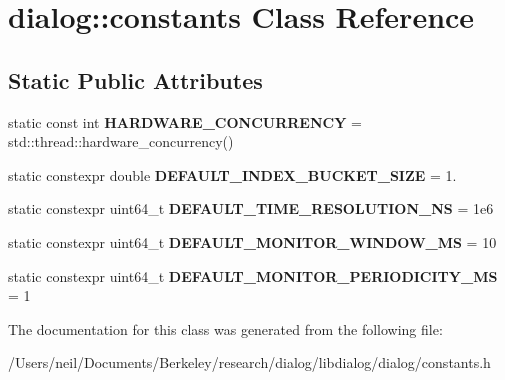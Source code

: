 \hypertarget{classdialog_1_1constants}{}\section{dialog\+:\+:constants Class Reference}
\label{classdialog_1_1constants}
\subsection*{Static Public Attributes}
\begin{DoxyCompactItemize}
\item 
\mbox{\label{classdialog_1_1constants_aaa85f1a9924be4abd5cc4a54714ee115}} 
static const int {\bfseries H\+A\+R\+D\+W\+A\+R\+E\+\_\+\+C\+O\+N\+C\+U\+R\+R\+E\+N\+CY} = std\+::thread\+::hardware\+\_\+concurrency()
\item 
\mbox{\label{classdialog_1_1constants_a4f7aa966b00a011b90ff6ad7b4455f6d}} 
static constexpr double {\bfseries D\+E\+F\+A\+U\+L\+T\+\_\+\+I\+N\+D\+E\+X\+\_\+\+B\+U\+C\+K\+E\+T\+\_\+\+S\+I\+ZE} = 1.
\item 
\mbox{\label{classdialog_1_1constants_aeb655030eb65804ef504b2ab7f781ba6}} 
static constexpr uint64\+\_\+t {\bfseries D\+E\+F\+A\+U\+L\+T\+\_\+\+T\+I\+M\+E\+\_\+\+R\+E\+S\+O\+L\+U\+T\+I\+O\+N\+\_\+\+NS} = 1e6
\item 
\mbox{\label{classdialog_1_1constants_a6397aad130172a714ab62eaa38eccd8c}} 
static constexpr uint64\+\_\+t {\bfseries D\+E\+F\+A\+U\+L\+T\+\_\+\+M\+O\+N\+I\+T\+O\+R\+\_\+\+W\+I\+N\+D\+O\+W\+\_\+\+MS} = 10
\item 
\mbox{\label{classdialog_1_1constants_ac7adb4a95712cea788f3e6d8684a347d}} 
static constexpr uint64\+\_\+t {\bfseries D\+E\+F\+A\+U\+L\+T\+\_\+\+M\+O\+N\+I\+T\+O\+R\+\_\+\+P\+E\+R\+I\+O\+D\+I\+C\+I\+T\+Y\+\_\+\+MS} = 1
\end{DoxyCompactItemize}


The documentation for this class was generated from the following file\+:\begin{DoxyCompactItemize}
\item 
/\+Users/neil/\+Documents/\+Berkeley/research/dialog/libdialog/dialog/constants.\+h\end{DoxyCompactItemize}
